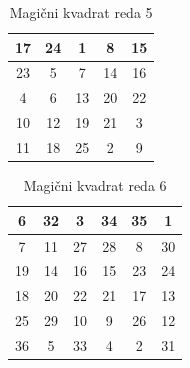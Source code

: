 \documentclass[a4paper,12pt]{article}
\theoremstyle{plain}
\theoremstyle{definition}
\begin{document}
\begin{table}[h!]
    \centering
    \caption{Magični kvadrat reda 5}
    \label{table:mag5}
    \begin{tabular}{|c|c|c|c|c|}
       \hline
       17 & 24 &  1 &  8 & 15 \\\hline
       23 &  5 &  7 & 14 & 16 \\\hline
        4 &  6 & 13 & 20 & 22 \\\hline
       10 & 12 & 19 & 21 &  3 \\\hline
       11 & 18 & 25 &  2 &  9 \\\hline
    \end{tabular}
 \end{table}
 \newpage
\begin{table}[h!]
    \centering
    \caption{Magični kvadrat reda 6}
    \label{table:mag6}
    \begin{tabular}{|c|c|c|c|c|c|}
       \hline
       6 & 32 &  3 & 34 & 35 &  1 \\\hline
       7 & 11 & 27 & 28 &  8 & 30 \\\hline
      19 & 14 & 16 & 15 & 23 & 24 \\\hline
      18 & 20 & 22 & 21 & 17 & 13 \\\hline
      25 & 29 & 10 &  9 & 26 & 12 \\\hline
      36 &  5 & 33 &  4 &  2 & 31 \\\hline
    \end{tabular}
 \end{table}
\end{document}
